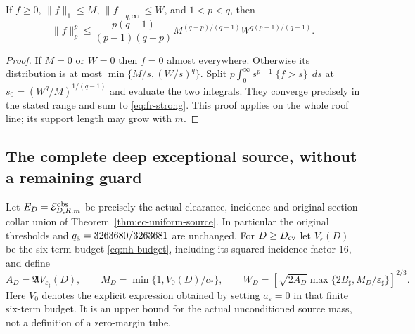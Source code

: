 \begin{lemma}
\label{lem:fr-strong}
If $f\ge0$, $\|f\|_1\le M$, $\|f\|_{q,\infty}\le W$, and
$1<p<q$, then
\begin{equation}\label{eq:fr-strong}
 \|f\|_p^p\le
 \frac{p(q-1)}{(p-1)(q-p)}
 M^{(q-p)/(q-1)}W^{q(p-1)/(q-1)}.
\end{equation}
\end{lemma}
\begin{proof}
If $M=0$ or $W=0$ then $f=0$ almost everywhere.
Otherwise its distribution is at most
$\min\{M/s,(W/s)^q\}$.
Split $p\int_0^\infty s^{p-1}|\{f>s\}|\,ds$ at
$s_0=(W^q/M)^{1/(q-1)}$ and evaluate the two integrals.
They converge precisely in the stated range and sum to
\eqref{eq:fr-strong}.  This proof applies on the whole roof line;
its support length may grow with $m$.
\end{proof}

\subsection{The complete deep exceptional source, without a remaining guard}
Let $E_D=\mathcal E^{\rm obs}_{D,R,m}$ be precisely the actual
clearance, incidence and original-section collar union of
Theorem~\ref{thm:ec-uniform-source}.  In particular the original
thresholds and $q_{\rm a}=3263680/3263681$ are unchanged.
For $D\ge D_{\rm cv}$ let $V_\varepsilon(D)$ be the six-term
budget \eqref{eq:nh-budget}, including its squared-incidence factor
$16$, and define
\begin{equation}\label{eq:fr-deep-constants}
 A_D=\mathfrak A V_{\varepsilon_\sharp}(D),\qquad
 M_D=\min\{1,V_0(D)/c_*\},\qquad
 W_D=\left[\sqrt{2A_D}
              \max\{2B_\sharp,M_D/\varepsilon_\sharp\}\right]^{2/3}.
\end{equation}
Here $V_0$ denotes the explicit expression obtained by setting
$a_\varepsilon=0$ in that finite six-term budget.  It is an upper
bound for the actual unconditioned source mass, not a definition of
a zero-margin tube.

